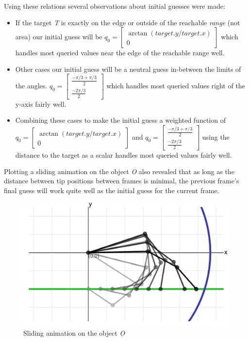 \documentclass{article}
\begin{document}
Using these relations several observations about initial guesses were made:

\begin{itemize}
\item{If the target \textit{T} is exactly on the edge or outside of the reachable \textit{range} (not area) our initial guess will be \(q_0 = \begin{bmatrix}\arctan(target.y / target.x)\\0\end{bmatrix}\) which handles most queried values near the edge of the reachable range well.}
\item{Other cases our initial guess will be a neutral guess in-between the limits of the angles. \(q_0 = \begin{bmatrix}
\frac{-\pi/3+\pi/3}{2}
\\
\frac{-2\pi/3}{2}
\end{bmatrix}\) which handles most queried values right of the y-axis fairly well.}
\item{Combining these cases to make the initial guess a weighted function of \(q_0 = \begin{bmatrix}\arctan(target.y / target.x)\\0\end{bmatrix}\) and \(q_0 = \begin{bmatrix}
\frac{-\pi/3+\pi/3}{2}
\\
\frac{-2\pi/3}{2}
\end{bmatrix}\) using the distance to the target as a scalar handles most queried values fairly well.}
\end{itemize}

Plotting a sliding animation on the object \textit{O} also revealed that as long as the distance between tip positions between frames is minimal, the previous frame's final guess will work quite well as the initial guess for the current frame. 

\begin{figure}[h]
\centering
\includegraphics[scale=0.17]{animation.png}
\caption{Sliding animation on the object \textit{O}}
\end{figure}
\newpage
\end{document}
